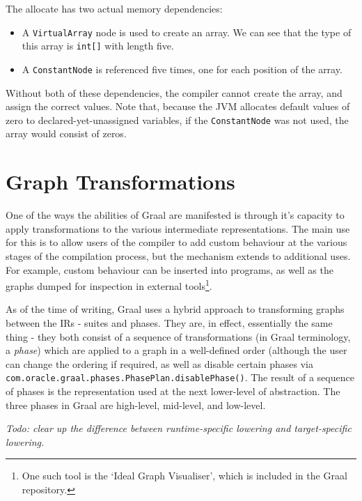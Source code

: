 The allocate has two actual memory dependencies:

\begin{itemize}
	\item A \texttt{VirtualArray} node is used to create an array. We can see that the type of this array is \texttt{int[]} with length five.
	
	\item A \texttt{ConstantNode} is referenced five times, one for each position of the array.
\end{itemize}

Without both of these dependencies, the compiler cannot create the array, and assign the correct values. Note that, because the JVM allocates default values of zero to declared-yet-unassigned variables, if the \texttt{ConstantNode} was not used, the array would consist of zeros.

\section{Graph Transformations} \label{sec:graal/transformations}
One of the ways the abilities of Graal are manifested is through it's capacity to apply transformations to the various intermediate representations. The main use for this is to allow users of the compiler to add custom behaviour at the various stages of the compilation process, but the mechanism extends to additional uses. For example, custom behaviour can be inserted into programs, as well as the graphs dumped for inspection in external tools\footnote{One such tool is the `Ideal Graph Visualiser', which is included in the Graal repository.}.

As of the time of writing, Graal uses a hybrid approach to transforming graphs between the IRs - suites and phases. They are, in effect, essentially the same thing - they both consist of a sequence of transformations (in Graal terminology, a \textit{phase}) which are applied to a graph in a well-defined order (although the user can change the ordering if required, as well as disable certain phases via \texttt{com.oracle.graal.phases.PhasePlan.disablePhase()}. The result of a sequence of phases is the representation used at the next lower-level of abstraction. The three phases in Graal are high-level, mid-level, and low-level.

\small{\textit{Todo: clear up the difference between runtime-specific lowering and target-specific lowering.}}

